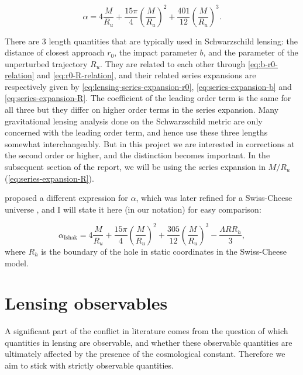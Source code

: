 \begin{equation}
  \alpha = 4 \frac{M}{R_u} + \frac{15\pi}{4} \left ( \frac{M}{R_u} \right )^2 + \frac{401}{12} \left ( \frac{M}{R_u} \right )^3.
  \label{eq:series-expansion-R}
\end{equation}

There are 3 length quantities that are typically used in Schwarzschild lensing: the distance of closest approach $r_0$, the impact parameter $b$, and the parameter of the unperturbed trajectory $R_u$. They are related to each other through \autoref{eq:b-r0-relation} and \autoref{eq:r0-R-relation}, and their related series expansions are respectively given by \autoref{eq:lensing-series-expansion-r0}, \autoref{eq:series-expansion-b} and \autoref{eq:series-expansion-R}. The coefficient of the leading order term is the same for all three but they differ on higher order terms in the series expansion. Many gravitational lensing analysis done on the Schwarzschild metric are only concerned with the leading order term, and hence use these three lengths somewhat interchangeably. But in this project we are interested in corrections at the second order or higher, and the distinction becomes important. In the subsequent section of the report, we will be using the series expansion in $M/R_u$ (\autoref{eq:series-expansion-R}). 

\citet{rindler2007contribution} proposed a different expression for $\alpha$, which was later refined for a Swiss-Cheese universe \citep{ishak2008new}, and I will state it here (in our notation) for easy comparison:

\begin{equation}
  \alpha_{\text{Ishak}} = 4 \frac{M}{R_u} + \frac{15\pi}{4} \left ( \frac{M}{R_u} \right )^2 + \frac{305}{12} \left ( \frac{M}{R_u} \right )^3 - \frac{\Lambda R R_h}{3},
  \label{eq:rindler-ishak-alpha}
\end{equation}
where $R_h$ is the boundary of the hole in static coordinates in the Swiss-Cheese model. 

\section{Lensing observables}

A significant part of the conflict in literature comes from the question of which quantities in lensing are observable, and whether these observable quantities are ultimately affected by the presence of the cosmological constant. Therefore we aim to stick with strictly observable quantities. 

